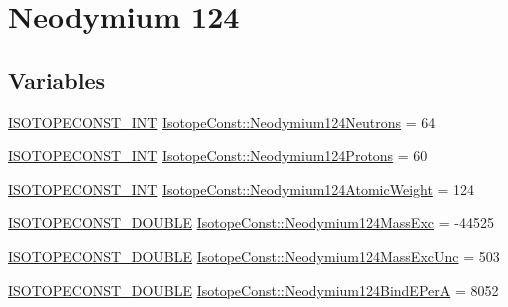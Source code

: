\hypertarget{group___isotope_const-_neodymium-_nd124}{}\section{Neodymium 124}
\label{group___isotope_const-_neodymium-_nd124}
\subsection*{Variables}
\begin{DoxyCompactItemize}
\item 
\mbox{\hyperlink{group___isotope_const-_macros_ga5f18360b3e99483a35c32d789e62621c}{I\+S\+O\+T\+O\+P\+E\+C\+O\+N\+S\+T\+\_\+\+I\+NT}} \mbox{\hyperlink{group___isotope_const-_neodymium-_nd124_gab77ceed1f518d3d5a51c6ca1906dd487}{Isotope\+Const\+::\+Neodymium124\+Neutrons}} = 64
\item 
\mbox{\hyperlink{group___isotope_const-_macros_ga5f18360b3e99483a35c32d789e62621c}{I\+S\+O\+T\+O\+P\+E\+C\+O\+N\+S\+T\+\_\+\+I\+NT}} \mbox{\hyperlink{group___isotope_const-_neodymium-_nd124_ga713ebe4128993eec0d239682328cd65b}{Isotope\+Const\+::\+Neodymium124\+Protons}} = 60
\item 
\mbox{\hyperlink{group___isotope_const-_macros_ga5f18360b3e99483a35c32d789e62621c}{I\+S\+O\+T\+O\+P\+E\+C\+O\+N\+S\+T\+\_\+\+I\+NT}} \mbox{\hyperlink{group___isotope_const-_neodymium-_nd124_ga1fcb3bad8c8df5e76d2ee0e35c322129}{Isotope\+Const\+::\+Neodymium124\+Atomic\+Weight}} = 124
\item 
\mbox{\hyperlink{group___isotope_const-_macros_ga8f45a7272ce02c0b4c65c44636ed719a}{I\+S\+O\+T\+O\+P\+E\+C\+O\+N\+S\+T\+\_\+\+D\+O\+U\+B\+LE}} \mbox{\hyperlink{group___isotope_const-_neodymium-_nd124_ga18225352a4bdc79aad89f81890fe0c92}{Isotope\+Const\+::\+Neodymium124\+Mass\+Exc}} = -\/44525
\item 
\mbox{\hyperlink{group___isotope_const-_macros_ga8f45a7272ce02c0b4c65c44636ed719a}{I\+S\+O\+T\+O\+P\+E\+C\+O\+N\+S\+T\+\_\+\+D\+O\+U\+B\+LE}} \mbox{\hyperlink{group___isotope_const-_neodymium-_nd124_gaf2e45c8b79017248d883bd6d7e7da0d6}{Isotope\+Const\+::\+Neodymium124\+Mass\+Exc\+Unc}} = 503
\item 
\mbox{\hyperlink{group___isotope_const-_macros_ga8f45a7272ce02c0b4c65c44636ed719a}{I\+S\+O\+T\+O\+P\+E\+C\+O\+N\+S\+T\+\_\+\+D\+O\+U\+B\+LE}} \mbox{\hyperlink{group___isotope_const-_neodymium-_nd124_ga4782e6ac471d7ef760e48c2237378d49}{Isotope\+Const\+::\+Neodymium124\+Bind\+E\+PerA}} = 8052
\item 

\end{DoxyCompactItemize}
